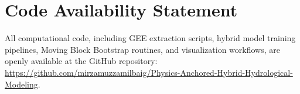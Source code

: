 \documentclass[11pt,a4paper,fleqn]{article}
\begin{document}
\section*{Code Availability Statement}
All computational code, including GEE extraction scripts, hybrid model training pipelines, Moving Block Bootstrap routines, and visualization workflows, are openly available at the GitHub repository: \url{https://github.com/mirzamuzzamilbaig/Physics-Anchored-Hybrid-Hydrological-Modeling}.




\end{document}
